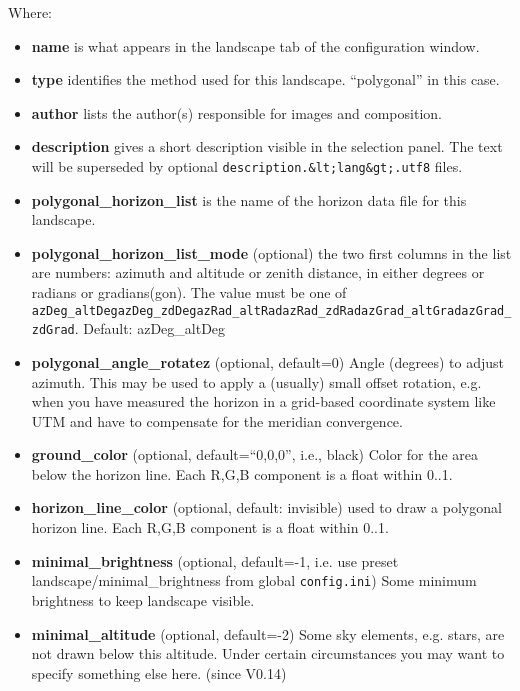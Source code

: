 Where:

\begin{itemize}
\item
  \textbf{name} is what appears in the landscape tab of the
  configuration window.
\item
  \textbf{type} identifies the method used for this landscape.
  ``polygonal'' in this case.
\item
  \textbf{author} lists the author(s) responsible for images and
  composition.
\item
  \textbf{description} gives a short description visible in the
  selection panel. The text will be superseded by optional
  \texttt{description.\&lt;lang\&gt;.utf8} files.
\item
  \textbf{polygonal\_horizon\_list} is the name of the horizon data file
  for this landscape.
\item
  \textbf{polygonal\_horizon\_list\_mode} (optional) the two first
  columns in the list are numbers: azimuth and altitude or zenith
  distance, in either degrees or radians or gradians(gon). The value
  must be one of
  \texttt{azDeg\_altDeg\textbar{}azDeg\_zdDeg\textbar{}azRad\_altRad\textbar{}azRad\_zdRad\textbar{}azGrad\_altGrad\textbar{}azGrad\_zdGrad}.
  Default: azDeg\_altDeg
\item
  \textbf{polygonal\_angle\_rotatez} (optional, default=0) Angle
  (degrees) to adjust azimuth. This may be used to apply a (usually)
  small offset rotation, e.g. when you have measured the horizon in a
  grid-based coordinate system like UTM and have to compensate for the
  meridian convergence.
\item
  \textbf{ground\_color} (optional, default=``0,0,0'', i.e., black)
  Color for the area below the horizon line. Each R,G,B component is a
  float within 0..1.
\item
  \textbf{horizon\_line\_color} (optional, default: invisible) used to
  draw a polygonal horizon line. Each R,G,B component is a float within
  0..1.
\item
  \textbf{minimal\_brightness} (optional, default=-1, i.e. use preset
  landscape/minimal\_brightness from global \texttt{config.ini}) Some
  minimum brightness to keep landscape visible.
\item
  \textbf{minimal\_altitude} (optional, default=-2) Some sky elements,
  e.g. stars, are not drawn below this altitude. Under certain
  circumstances you may want to specify something else here. (since
  V0.14)
\end{itemize}

